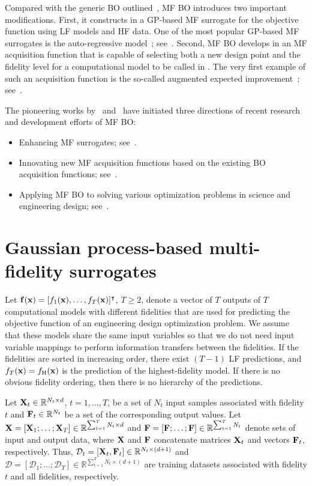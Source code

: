 \documentclass[journal ]{new-aiaa}
\newcommand{\edit}[1]{\textcolor{red}{#1}} %
\begin{document}
Compared with the generic BO outlined~, MF BO introduces two important modifications.
First, it constructs in  a GP-based MF surrogate for the objective function using LF models and HF data.
One of the most popular GP-based MF surrogates is the auto-regressive model~\citep{Kennedy2000}; see~.
Second, MF BO develops in  an MF acquisition function that is capable of selecting both a new design point and the fidelity level for a computational model to be called in .
The very first example of such an acquisition function is the so-called augmented expected improvement~\citep{Huang2006smo}; see~. 

The pioneering works by~\citet{Kennedy2000} and~\citet{Huang2006smo} have initiated three
{directions}
of recent research and development efforts of MF BO:
\begin{itemize}
	\item Enhancing MF surrogates; see~.
	
	\item Innovating new MF acquisition functions based on the existing BO acquisition functions; see~.
	
	\item Applying MF BO to solving various optimization problems in science and engineering design; see~.	
\end{itemize}

\section{Gaussian process-based multi-fidelity surrogates}\label{Sec4}

Let ${\bf f}({\bf x})=[f_1({\bf x}),\dots,f_T({\bf x})]^\intercal$, $T \geq 2$, denote a vector of $T$ outputs of $T$ computational models with different fidelities that are used for predicting the objective function of an engineering design optimization problem.
We assume that these models share the same input variables so that we do not need input variable mappings to perform information transfers between the fidelities.
If the fidelities are sorted in increasing order, there exist $(T-1)$ LF predictions, and $f_T({\bf x})=f_\text{H}({\bf x})$ is the prediction of the highest-fidelity model.
If there is no obvious fidelity ordering, then there is no hierarchy of the predictions.

Let ${\bf X}_{t}\in \mathbb{R}^{N_t \times d}$, $t=1,\dots,T$, be a set of $N_t$ input samples associated with fidelity $t$ and ${\bf F}_{t}\in \mathbb{R}^{N_t}$ be a set of the corresponding output values.
Let ${\bf X}=[{\bf X}_1;\dots;{\bf X}_T] \in \mathbb{R}^{\sum_{t=1}^{T} N_t \times d}$ and ${\bf F}=[{\bf F};\dots;{\bf F}] \in \mathbb{R}^{\sum_{t=1}^{T} N_t}$ denote sets of input and output data, where ${\bf X}$ and ${\bf F}$ concatenate matrices ${\bf X}_t$ and vectors ${\bf F}_t$, respectively. 
Thus, $\mathcal{D}_t=[{\bf X}_t,{\bf F}_t] \in \mathbb{R}^{N_t \times (d+1)}$ and $\mathcal{D}=[\mathcal{D}_1;\dots;\mathcal{D}_T] \in \mathbb{R}^{\sum_{t=1}^{T} N_t \times (d+1)}$ are training datasets associated with fidelity $t$ and all fidelities, respectively.
\end{document}
